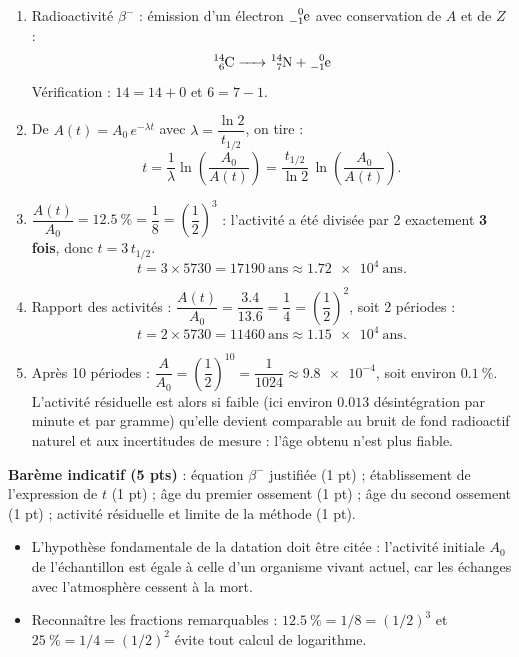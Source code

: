 \documentclass[11pt]{article}
\begin{document}
\begin{corrige}
\begin{enumerate}
\item Radioactivité $\beta^-$ : émission d'un électron $\ce{^{0}_{-1}e}$ avec conservation de $A$ et de $Z$ :
\[ \ce{^{14}_{6}C -> ^{14}_{7}N + ^{0}_{-1}e} \]
Vérification : $14 = 14 + 0$ et $6 = 7 - 1$.
\item De $A(t) = A_0\,e^{-\lambda t}$ avec $\lambda = \dfrac{\ln 2}{t_{1/2}}$, on tire :
\[ t = \frac{1}{\lambda}\ln\!\left(\frac{A_0}{A(t)}\right) = \frac{t_{1/2}}{\ln 2}\,\ln\!\left(\frac{A_0}{A(t)}\right). \]
\item $\dfrac{A(t)}{A_0} = \num{12,5}\ \% = \dfrac{1}{8} = \left(\dfrac{1}{2}\right)^{3}$ : l'activité a été divisée par 2 exactement \textbf{3 fois}, donc $t = 3\,t_{1/2}$.
\[ t = 3 \times \num{5730} = \num{17190}\ \text{ans} \approx \num{1,72e4}\ \text{ans}. \]
\item Rapport des activités : $\dfrac{A(t)}{A_0} = \dfrac{\num{3,4}}{\num{13,6}} = \dfrac{1}{4} = \left(\dfrac{1}{2}\right)^{2}$, soit 2 périodes :
\[ t = 2 \times \num{5730} = \num{11460}\ \text{ans} \approx \num{1,15e4}\ \text{ans}. \]
\item Après 10 périodes : $\dfrac{A}{A_0} = \left(\dfrac{1}{2}\right)^{10} = \dfrac{1}{1024} \approx \num{9,8e-4}$, soit environ $\num{0,1}\ \%$. L'activité résiduelle est alors si faible (ici environ $\num{0,013}$ désintégration par minute et par gramme) qu'elle devient comparable au bruit de fond radioactif naturel et aux incertitudes de mesure : l'âge obtenu n'est plus fiable.
\end{enumerate}
\textbf{Barème indicatif (5 pts)} : équation $\beta^-$ justifiée (1 pt) ; établissement de l'expression de $t$ (1 pt) ; âge du premier ossement (1 pt) ; âge du second ossement (1 pt) ; activité résiduelle et limite de la méthode (1 pt).
\end{corrige}
\begin{attention}
\begin{itemize}
\item L'hypothèse fondamentale de la datation doit être citée : l'activité initiale $A_0$ de l'échantillon est égale à celle d'un organisme vivant actuel, car les échanges avec l'atmosphère cessent à la mort.
\item Reconnaître les fractions remarquables : $\num{12,5}\ \% = 1/8 = (1/2)^{3}$ et $\num{25}\ \% = 1/4 = (1/2)^{2}$ évite tout calcul de logarithme.
\end{itemize}
\end{attention}
\end{document}

